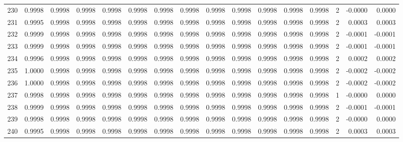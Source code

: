 \begin{tabular}{lrrrrrrrrrrrrrrr}
230 &      0.9998 &  0.9998 &  0.9998 &  0.9998 &  0.9998 &  0.9998 &  0.9998 &  0.9998 &  0.9998 &  0.9998 &   0.9998 &     0.9998 &      2 &                   -0.0000 &                     0.0000 \\
231 &      0.9995 &  0.9998 &  0.9998 &  0.9998 &  0.9998 &  0.9998 &  0.9998 &  0.9998 &  0.9998 &  0.9998 &   0.9998 &     0.9998 &      2 &                    0.0003 &                     0.0003 \\
232 &      0.9999 &  0.9998 &  0.9998 &  0.9998 &  0.9998 &  0.9998 &  0.9998 &  0.9998 &  0.9998 &  0.9998 &   0.9998 &     0.9998 &      2 &                   -0.0001 &                    -0.0001 \\
233 &      0.9999 &  0.9998 &  0.9998 &  0.9998 &  0.9998 &  0.9998 &  0.9998 &  0.9998 &  0.9998 &  0.9998 &   0.9998 &     0.9998 &      2 &                   -0.0001 &                    -0.0001 \\
234 &      0.9996 &  0.9998 &  0.9998 &  0.9998 &  0.9998 &  0.9998 &  0.9998 &  0.9998 &  0.9998 &  0.9998 &   0.9998 &     0.9998 &      2 &                    0.0002 &                     0.0002 \\
235 &      1.0000 &  0.9998 &  0.9998 &  0.9998 &  0.9998 &  0.9998 &  0.9998 &  0.9998 &  0.9998 &  0.9998 &   0.9998 &     0.9998 &      2 &                   -0.0002 &                    -0.0002 \\
236 &      1.0000 &  0.9998 &  0.9998 &  0.9998 &  0.9998 &  0.9998 &  0.9998 &  0.9998 &  0.9998 &  0.9998 &   0.9998 &     0.9998 &      2 &                   -0.0002 &                    -0.0002 \\
237 &      0.9998 &  0.9998 &  0.9998 &  0.9998 &  0.9998 &  0.9998 &  0.9998 &  0.9998 &  0.9998 &  0.9998 &   0.9998 &     0.9998 &      1 &                   -0.0000 &                     0.0000 \\
238 &      0.9999 &  0.9998 &  0.9998 &  0.9998 &  0.9998 &  0.9998 &  0.9998 &  0.9998 &  0.9998 &  0.9998 &   0.9998 &     0.9998 &      2 &                   -0.0001 &                    -0.0001 \\
239 &      0.9998 &  0.9998 &  0.9998 &  0.9998 &  0.9998 &  0.9998 &  0.9998 &  0.9998 &  0.9998 &  0.9998 &   0.9998 &     0.9998 &      2 &                   -0.0000 &                     0.0000 \\
240 &      0.9995 &  0.9998 &  0.9998 &  0.9998 &  0.9998 &  0.9998 &  0.9998 &  0.9998 &  0.9998 &  0.9998 &   0.9998 &     0.9998 &      2 &                    0.0003 &                     0.0003 \\

\end{tabular}
